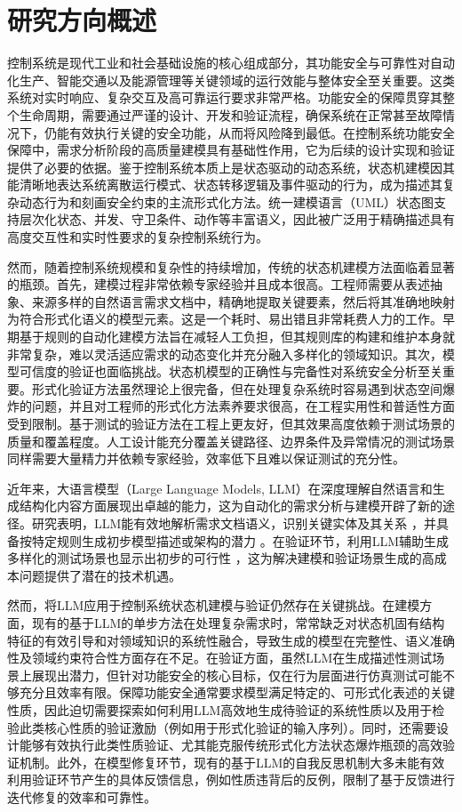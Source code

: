 \section{研究方向概述}
\label{section-generic}

控制系统是现代工业和社会基础设施的核心组成部分，其功能安全与可靠性对自动化生产、智能交通以及能源管理等关键领域的运行效能与整体安全至关重要。这类系统对实时响应、复杂交互及高可靠运行要求非常严格。功能安全的保障贯穿其整个生命周期，需要通过严谨的设计、开发和验证流程，确保系统在正常甚至故障情况下，仍能有效执行关键的安全功能，从而将风险降到最低。在控制系统功能安全保障中，需求分析阶段的高质量建模具有基础性作用，它为后续的设计实现和验证提供了必要的依据。鉴于控制系统本质上是状态驱动的动态系统，状态机建模因其能清晰地表达系统离散运行模式、状态转移逻辑及事件驱动的行为，成为描述其复杂动态行为和刻画安全约束的主流形式化方法。统一建模语言（UML）状态图支持层次化状态、并发、守卫条件、动作等丰富语义，因此被广泛用于精确描述具有高度交互性和实时性要求的复杂控制系统行为。

然而，随着控制系统规模和复杂性的持续增加，传统的状态机建模方法面临着显著的瓶颈。首先，建模过程非常依赖专家经验并且成本很高。工程师需要从表述抽象、来源多样的自然语言需求文档中，精确地提取关键要素，然后将其准确地映射为符合形式化语义的模型元素。这是一个耗时、易出错且非常耗费人力的工作。早期基于规则的自动化建模方法旨在减轻人工负担，但其规则库的构建和维护本身就非常复杂，难以灵活适应需求的动态变化并充分融入多样化的领域知识。其次，模型可信度的验证也面临挑战。状态机模型的正确性与完备性对系统安全分析至关重要。形式化验证方法虽然理论上很完备，但在处理复杂系统时容易遇到状态空间爆炸的问题，并且对工程师的形式化方法素养要求很高，在工程实用性和普适性方面受到限制。基于测试的验证方法在工程上更友好，但其效果高度依赖于测试场景的质量和覆盖程度。人工设计能充分覆盖关键路径、边界条件及异常情况的测试场景同样需要大量精力并依赖专家经验，效率低下且难以保证测试的充分性。

近年来，大语言模型（Large Language Models, LLM）在深度理解自然语言和生成结构化内容方面展现出卓越的能力，这为自动化的需求分析与建模开辟了新的途径。研究表明，LLM能有效地解析需求文档语义，识别关键实体及其关系 ，并具备按特定规则生成初步模型描述或架构的潜力 。在验证环节，利用LLM辅助生成多样化的测试场景也显示出初步的可行性 ，这为解决建模和验证场景生成的高成本问题提供了潜在的技术机遇。

然而，将LLM应用于控制系统状态机建模与验证仍然存在关键挑战。在建模方面，现有的基于LLM的单步方法在处理复杂需求时，常常缺乏对状态机固有结构特征的有效引导和对领域知识的系统性融合，导致生成的模型在完整性、语义准确性及领域约束符合性方面存在不足。在验证方面，虽然LLM在生成描述性测试场景上展现出潜力，但针对功能安全的核心目标，仅在行为层面进行仿真测试可能不够充分且效率有限。保障功能安全通常要求模型满足特定的、可形式化表述的关键性质，因此迫切需要探索如何利用LLM高效地生成待验证的系统性质以及用于检验此类核心性质的验证激励（例如用于形式化验证的输入序列）。同时，还需要设计能够有效执行此类性质验证、尤其能克服传统形式化方法状态爆炸瓶颈的高效验证机制。此外，在模型修复环节，现有的基于LLM的自我反思机制大多未能有效利用验证环节产生的具体反馈信息，例如性质违背后的反例，限制了基于反馈进行迭代修复的效率和可靠性。

